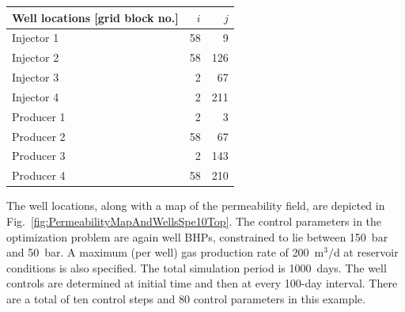 \documentclass[twocolumn,numbook]{svjour3}          %
\begin{document}
\begin{table}
\begin{tabular}{|l|rr|}
\hline\hline
Well locations [grid block no.] & $i$ & $j$     \\
\hline
Injector 1               &   58&   9   \\
Injector 2               &   58& 126   \\
Injector 3               &    2&  67   \\
Injector 4               &    2& 211   \\
Producer 1               &    2&   3   \\
Producer 2               &   58&  67   \\
Producer 3               &    2& 143   \\
Producer 4               &   58& 210   \\
\hline
\end{tabular}
\label{table:spe10toplayer}
\end{table}



The well locations, along with a map of the permeability field, are depicted in
Fig.~\ref{fig:PermeabilityMapAndWellsSpe10Top}. The control parameters in the
optimization problem are again well BHPs, constrained to lie between 150~bar and 50~bar. A
maximum (per well) gas production rate of 200~m$^3/$d at reservoir conditions is also specified.
The total simulation period is 1000~days. The well controls are determined
at initial time and then at every 100-day interval. There are a
total of ten control steps and 80 control parameters in this example.
\end{document}
